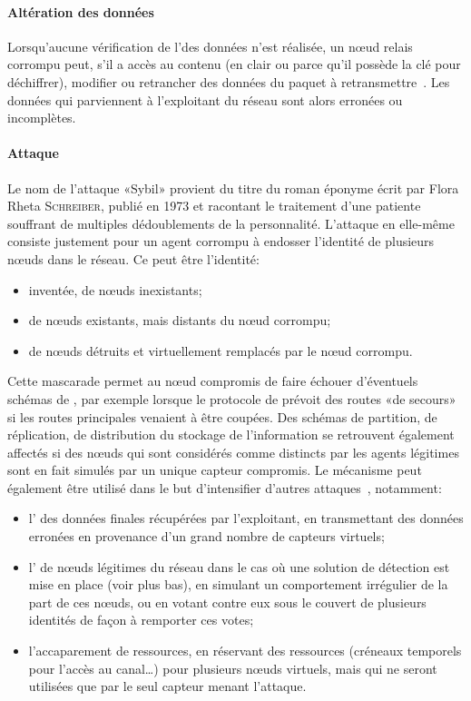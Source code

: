         \paragraph{Altération des données}
Lorsqu'aucune vérification de l'\integrite des données n'est réalisée, un nœud relais corrompu peut, s'il a accès au contenu (en clair ou parce qu'il possède la clé pour déchiffrer), modifier ou retrancher des données du paquet à retransmettre~\cite{SZFDXC14}.
Les données qui parviennent à l'exploitant du réseau sont alors erronées ou incomplètes.

        \paragraph{Attaque }
Le nom de l'attaque «Sybil» provient du titre du roman éponyme écrit par Flora Rheta \textsc{Schreiber}, publié en 1973 et racontant le traitement d'une patiente souffrant de multiples dédoublements de la personnalité.
L'attaque en elle-même consiste justement pour un agent corrompu à endosser l'identité de plusieurs nœuds dans le réseau.
Ce peut être l'identité:
\begin{itemize}
    \item inventée, de nœuds inexistants;
    \item de nœuds existants, mais distants du nœud corrompu;
    \item de nœuds détruits et virtuellement remplacés par le nœud corrompu.
\end{itemize}
Cette mascarade permet au nœud compromis de faire échouer d'éventuels schémas de \resilience, par exemple lorsque le protocole de  prévoit des routes «de secours» si les routes principales venaient à être coupées.
Des schémas de partition, de réplication, de distribution du stockage de l'information se retrouvent également affectés si des nœuds qui sont considérés comme distincts par les agents légitimes sont en fait simulés par un unique capteur compromis.
Le mécanisme peut également être utilisé dans le but d'intensifier d'autres attaques~\cite{NSSP04}, notamment:
\begin{itemize}
    \item l' des données finales récupérées par l'exploitant, en transmettant des données erronées en provenance d'un grand nombre de capteurs virtuels;
    \item l' de nœuds légitimes du réseau dans le cas où une solution de détection est mise en place (voir plus bas), en simulant un comportement irrégulier de la part de ces nœuds, ou en votant contre eux sous le couvert de plusieurs identités de façon à remporter ces votes;
    \item l'accaparement de ressources, en réservant des ressources (créneaux temporels pour l'accès au canal\dots) pour plusieurs nœuds virtuels, mais qui ne seront utilisées que par le seul capteur menant l'attaque.
\end{itemize}
